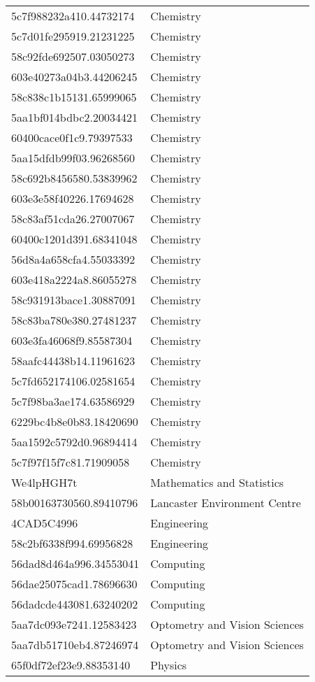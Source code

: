 \begin{tabular}{ll}
5c7f988232a410.44732174 & Chemistry \\
5c7d01fe295919.21231225 & Chemistry \\
58c92fde692507.03050273 & Chemistry \\
603e40273a04b3.44206245 & Chemistry \\
58c838c1b15131.65999065 & Chemistry \\
5aa1bf014bdbc2.20034421 & Chemistry \\
60400cace0f1c9.79397533 & Chemistry \\
5aa15dfdb99f03.96268560 & Chemistry \\
58c692b8456580.53839962 & Chemistry \\
603e3e58f40226.17694628 & Chemistry \\
58c83af51cda26.27007067 & Chemistry \\
60400c1201d391.68341048 & Chemistry \\
56d8a4a658cfa4.55033392 & Chemistry \\
603e418a2224a8.86055278 & Chemistry \\
58c931913bace1.30887091 & Chemistry \\
58c83ba780e380.27481237 & Chemistry \\
603e3fa46068f9.85587304 & Chemistry \\
58aafc44438b14.11961623 & Chemistry \\
5c7fd652174106.02581654 & Chemistry \\
5c7f98ba3ae174.63586929 & Chemistry \\
6229bc4b8e0b83.18420690 & Chemistry \\
5aa1592c5792d0.96894414 & Chemistry \\
5c7f97f15f7c81.71909058 & Chemistry \\
We4lpHGH7t & Mathematics and Statistics \\
58b00163730560.89410796 & Lancaster Environment Centre \\
4CAD5C4996 & Engineering \\
58c2bf6338f994.69956828 & Engineering \\
56dad8d464a996.34553041 & Computing \\
56dae25075cad1.78696630 & Computing \\
56dadcde443081.63240202 & Computing \\
5aa7dc093e7241.12583423 & Optometry and Vision Sciences \\
5aa7db51710eb4.87246974 & Optometry and Vision Sciences \\
65f0df72ef23e9.88353140 & Physics \\

\end{tabular}
